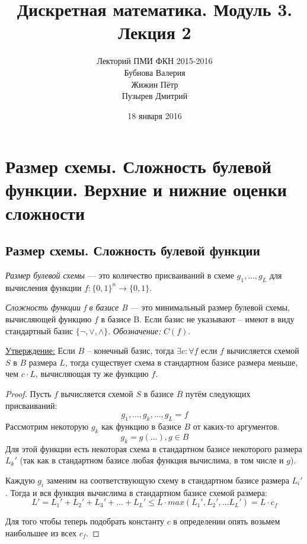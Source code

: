 \documentclass[a4paper, 12pt]{article}
\begin{document}
\title{Дискретная математика. Модуль 3. Лекция 2}
\author{Лекторий ПМИ ФКН 2015-2016\\Бубнова Валерия\\Жижин Пётр\\Пузырев Дмитрий}
\date{18 января 2016}

\maketitle
\section{Размер схемы. Сложность булевой функции. Верхние и нижние оценки сложности}
\subsection*{Размер схемы. Сложность булевой функции}
\textit{Размер булевой схемы} --- это количество присваиваний в схеме 
$g_1, \ldots, g_L$ для вычисления функции $f: \{0, 1\}^n \rightarrow \{0, 1\}$.

\textit{Сложность функции f в базисе B} --- это минимальный размер булевой схемы, 
вычисляющей функцию $f$ в базисе B. Если базис не указывают -- имеют в виду 
стандартный базис $\{\lnot, \lor, \land\}$. \textit{Обозначение:} $C(f)$.

\underline{Утверждение:} Если $B$ -- конечный базис, тогда $\exists c: \forall f $ если $f$ 
вычисляется схемой $S$ в $B$ размера $L$, тогда существует схема в стандартном базисе
размера меньше, чем $c \cdot L$, вычисляющая ту же функцию $f$. 
\begin{proof}
    Пусть $f$ вычисляется схемой $S$ в базисе $B$ путём следующих присваиваний:
    \[
    g_1, \ldots, g_k, \ldots, g_L = f
    \]
    Рассмотрим некоторую $g_k$ как функцию в базисе $B$ от каких-то аргументов.
    \[
    g_k = g(\ldots), g \in B
    \]
    Для этой функции есть некоторая схема в стандартном базисе некоторого размера $L_k'$
    (так как в стандартном базисе любая функция вычислима, в том числе и $g$).
    
    Каждую $g_i$ заменим на соответствующую схему в стандартном базисе размера $L_i'$.
    Тогда и вся функция вычислима в стандартном базисе схемой размера:
    \[
    L'= L_1' + L_2' + L_3' + \ldots + L_L' \leqslant L \cdot max(L_1', L_2', \ldots
    L_L') = L \cdot c_f
    \]

    Для того чтобы теперь подобрать константу $c$ в определении опять возьмем наибольшее
    из всех $c_f$.
\end{proof}
\end{document}
